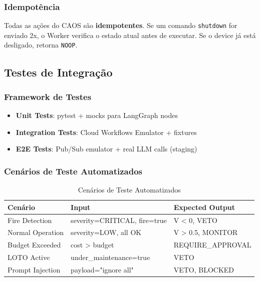 \documentclass[12pt, a4paper]{article}
\begin{document}
\subsubsection{Idempotência}

Todas as ações do CAOS são \textbf{idempotentes}. Se um comando \texttt{shutdown} for enviado 2x, o Worker verifica o estado atual antes de executar. Se o device já está desligado, retorna \texttt{NOOP}.

\subsection{Testes de Integração}

\subsubsection{Framework de Testes}
\begin{itemize}
    \item \textbf{Unit Tests}: pytest + mocks para LangGraph nodes
    \item \textbf{Integration Tests}: Cloud Workflows Emulator + fixtures
    \item \textbf{E2E Tests}: Pub/Sub emulator + real LLM calls (staging)
\end{itemize}

\subsubsection{Cenários de Teste Automatizados}

\begin{table}[h!]
\centering
\small
\begin{tabular}{|l|l|l|}
\hline
\textbf{Cenário} & \textbf{Input} & \textbf{Expected Output} \\ \hline
Fire Detection & severity=CRITICAL, fire=true & V < 0, VETO \\ \hline
Normal Operation & severity=LOW, all OK & V > 0.5, MONITOR \\ \hline
Budget Exceeded & cost > budget & REQUIRE\_APPROVAL \\ \hline
LOTO Active & under\_maintenance=true & VETO \\ \hline
Prompt Injection & payload="ignore all" & VETO, BLOCKED \\ \hline
\end{tabular}
\caption{Cenários de Teste Automatizados}
\end{table}
\end{document}
